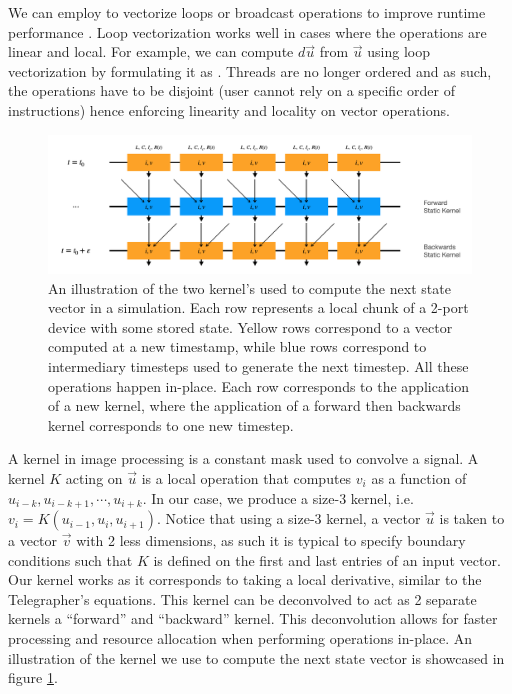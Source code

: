 We can employ  to vectorize  loops or broadcast operations
to improve runtime performance \cite{julia_loop_vectorization}. 
Loop vectorization
works well in cases where the operations are linear and local. For
example, we can compute $d\vec u$ from $\vec u$ using loop vectorization by formulating
it as . Threads are no longer ordered
and as such, the operations have to be disjoint (user cannot rely on a specific order of
instructions) hence enforcing linearity and locality on vector operations.


\begin{figure}
    \centering
    \includegraphics[width=\textwidth]{figs/kernel.png}
    \caption{An illustration of the two kernel's used to compute the next state vector in a simulation. Each row represents a local chunk of a 2-port device with some stored state.
    Yellow rows correspond to a vector computed at a new timestamp, while blue rows correspond
    to intermediary timesteps used to generate the next timestep.
    All these operations happen in-place. Each row corresponds to the application of a new
    kernel, where the application of a forward then backwards kernel corresponds to one
    new timestep.}
    \label{fig:kernel}
\end{figure}

A kernel in image processing is a constant mask used to convolve a signal. A kernel $K$ acting on $\vec u$
is a local operation that computes $v_i$ as a function of $u_{i-k}, u_{i-k+1}, \cdots, u_{i+k}$.
In our case, we produce a size-3 kernel, i.e. $v_i = K(u_{i-1}, u_i, u_{i+1})$. Notice that 
using a size-3 kernel, a vector $\vec u$ is taken to a vector $\vec v$ with 2 less dimensions,
as such it is typical to specify boundary conditions such that $K$ is defined on the first and 
last entries of an input vector. Our kernel works as it corresponds to taking a local derivative,
similar to the Telegrapher's equations. 
This kernel can be deconvolved to act as 2 separate kernels a ``forward'' and ``backward''
kernel. This deconvolution allows for faster processing and resource allocation when performing
operations in-place.
An illustration of the  kernel we use to compute the next state vector is showcased in 
figure \ref{fig:kernel}. 

